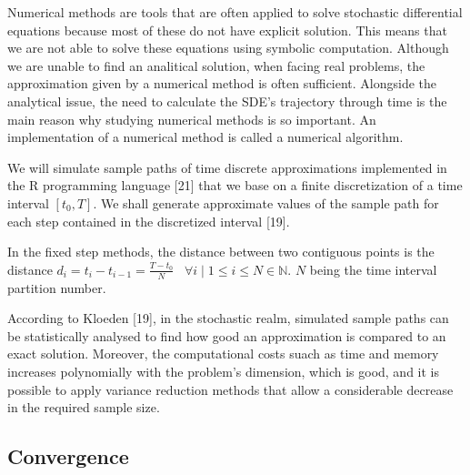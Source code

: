\documentclass[12pt,twoside]{reedthesis}
\theoremstyle{definition}
\theoremstyle{definition}
\theoremstyle{remark}
\begin{document}
  Numerical methods are tools that are often applied to solve stochastic
  differential equations because most of these do not have explicit
  solution. This means that we are not able to solve these equations using
  symbolic computation. Although we are unable to find an analitical
  solution, when facing real problems, the approximation given by a
  numerical method is often sufficient. Alongside the analytical issue,
  the need to calculate the SDE's trajectory through time is the main
  reason why studying numerical methods is so important. An implementation
  of a numerical method is called a numerical algorithm.
  
  We will simulate sample paths of time discrete approximations
  implemented in the R programming language {[}21{]} that we base on a
  finite discretization of a time interval \([t_0, T]\). We shall generate
  approximate values of the sample path for each step contained in the
  discretized interval {[}19{]}.
  
  In the fixed step methods, the distance between two contiguous points is
  the distance
  \(d_i = t_i - t_{i-1} = \frac{T-t_0}{N} \;\;\; \forall i \mid 1 \leq i \leq N \in \mathbb{N}\).
  \(N\) being the time interval partition number.
  
  According to Kloeden {[}19{]}, in the stochastic realm, simulated sample
  paths can be statistically analysed to find how good an approximation is
  compared to an exact solution. Moreover, the computational costs suach
  as time and memory increases polynomially with the problem's dimension,
  which is good, and it is possible to apply variance reduction methods
  that allow a considerable decrease in the required sample size.
  
  \subsection{Convergence}\label{convergence}
  
\end{document}

